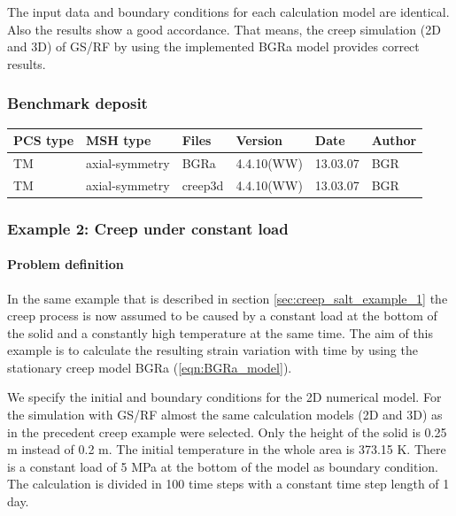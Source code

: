 The input data and boundary conditions for each calculation model
are identical. Also the results show a good accordance. That means,
the creep simulation (2D and 3D) of GS/RF by using the implemented
BGRa model provides correct results.

\subsubsection*{Benchmark deposit}

\begin{tabular}{|l|l|l|l|l|l|}
\hline
PCS type & MSH type       & Files   & Version    & Date    & Author\\
\hline
TM       & axial-symmetry & BGRa    & 4.4.10(WW) & 13.03.07 & BGR \\
\hline
TM       & axial-symmetry & creep3d & 4.4.10(WW) & 13.03.07 & BGR \\
\hline
\end{tabular}

\subsubsection*{Example 2: Creep under constant load}

\paragraph*{Problem definition}
%
In the same example that is described in section
\ref{sec:creep_salt_example_1} the creep process is now assumed to
be caused by a constant load at the bottom of the solid and a
constantly high temperature at the same time. The aim of this
example is to calculate the resulting strain variation with time by
using the stationary creep model BGRa (\ref{eqn:BGRa_model}).

We specify the initial and boundary conditions for the 2D numerical
model. For the simulation with GS/RF almost the same calculation
models (2D and 3D) as in the precedent creep example were selected.
Only the height of the solid is 0.25 m instead of 0.2 m. The initial
temperature in the whole area is 373.15 K. There is a constant load
of 5 MPa at the bottom of the model as boundary condition. The
calculation is divided in 100 time steps with a constant time step
length of 1 day.

